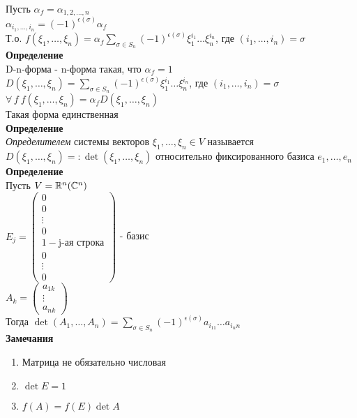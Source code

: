 \documentclass[12pt]{article}
\begin{document}
Пусть $\alpha_f = \alpha_{1,2,\ldots, n}$\\
$\alpha_{i_1, \ldots, i_n} = (-1)^{\epsilon(\sigma)}\alpha_f$\\
Т.о. $f(\xi_1, \ldots, \xi_n) = \alpha_f \sum_{\sigma \in S_n} (-1)^{\epsilon(\sigma)} \xi_1^{i_1}\ldots\xi_n^{i_n}$, где $(i_1, \ldots, i_n) = \sigma$\\
\textbf{Определение}\\
D-n-форма - n-форма такая, что $\alpha_f = 1$\\
$D(\xi_1, \ldots, \xi_n) = \sum_{\sigma \in S_n} (-1)^{\epsilon(\sigma)} \xi_1^{i_1}\ldots\xi_n^{i_n}$, где $(i_1, \ldots, i_n) = \sigma$\\
$\forall\,f\ f(\xi_1, \ldots, \xi_n) = \alpha_f D(\xi_1, \ldots, \xi_n)$\\
Такая форма единственная\\
\textbf{Определение}\\
\textit{Определителем} системы векторов $\xi_1, \ldots, \xi_n \in V$ называется $D(\xi_1, \ldots, \xi_n) =: \det (\xi_1, \ldots, \xi_n)$ относительно фиксированного базиса $e_1, \ldots, e_n$\\
\textbf{Определение}\\
Пусть $V = \mathbb{R}^n(\mathbb{C}^n)$\\
$E_j = \begin{pmatrix}0\\0\\\vdots\\0\\1 - \text{j-ая строка}\\0\\\vdots\\0\end{pmatrix}$ - базис\\
$A_k = \begin{pmatrix}a_{1k}\\\vdots\\a_{nk}\end{pmatrix}$\\
Тогда $\det (A_1, \ldots, A_n) = \sum_{\sigma \in S_n} (-1)^{\epsilon(\sigma)}a_{i_11}\ldots a_{i_nn}$\\
\textbf{Замечания}
\begin{enumerate}
    \item Матрица не обязательно числовая
    \item $\det E = 1$
    \item $f(A) = f(E) \det A$
\end{enumerate}
\end{document}
